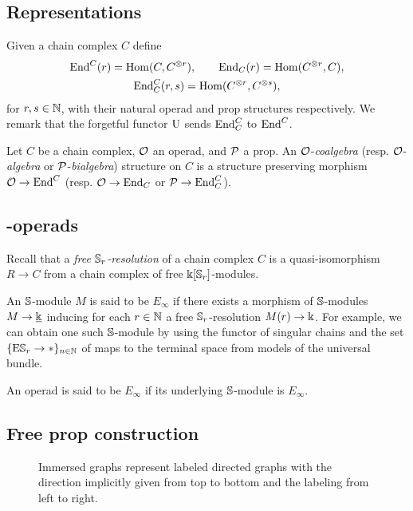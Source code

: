 \subsection{Representations}

Given a chain complex $C$ define
\begin{gather*}
\End^C(r) = \Hom(C, C^{\otimes r}), \qquad
\End_C(r) = \Hom(C^{\otimes r}, C), \\
\End^C_C(r, s) = \Hom(C^{\otimes r}, C^{\otimes s}),
\end{gather*}
for $r,s \in \N$, with their natural operad and prop structures respectively.
We remark that the forgetful functor $\forget$ sends $\End^C_C$ to $\End^C$.

Let $C$ be a chain complex, $\cO$ an operad, and $\cP$ a prop.
An $\cO$-\textit{coalgebra} (resp. $\cO$-\textit{algebra} or $\cP$-\textit{bialgebra}) structure on $C$ is a structure preserving morphism $\cO \to \End^C$ (resp. $\cO \to \End_C$ or $\cP \to \End_C^C$).

\subsection{\pdfEinfty-operads}

Recall that a \textit{free $\S_r$-resolution} of a chain complex $C$ is a quasi-isomorphism $R \to C$ from a chain complex of free $\k[\S_r]$-modules.

An $\S$-module $M$ is said to be $E_\infty$ if there exists a morphism of $\S$-modules $M \to \underline{\k}$ inducing for each $r \in \N$ a free $\S_r$-resolution $M(r) \to \k$.
For example, we can obtain one such $\S$-module by using the functor of singular chains and the set $\{\mathrm{E} \S_r \to \ast\}_{n \in \N}$ of maps to the terminal space from models of the universal bundle.

An operad is said to be $E_\infty$ if its underlying $\S$-module is $E_\infty$.

\subsection{Free prop construction} \label{ss:free prop}

\begin{figure}
	
	\caption{Immersed graphs represent labeled directed graphs with the direction implicitly given from top to bottom and the labeling from left to right.}
	\label{f:immersion}
\end{figure}

